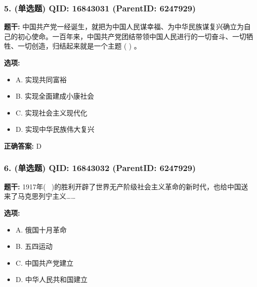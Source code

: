 \documentclass[12pt,UTF8]{ctexart}
\begin{document}
\vspace{0.3em}\hrulefill\vspace{0.7em}

\subsubsection*{5. (单选题) \small QID: 16843031 (ParentID: 6247929)}

\textbf{题干:}
中国共产党一经诞生，就把为中国人民谋幸福、为中华民族谋复兴确立为自己的初心使命。一百年来，中国共产党团结带领中国人民进行的一切奋斗、一切牺牲、一切创造，归结起来就是一个主题 ( ) 。



\textbf{选项:}
\begin{itemize}[leftmargin=*]

  \item A. 实现共同富裕

  \item B. 实现全面建成小康社会

  \item C. 实现社会主义现代化

  \item D. 实现中华民族伟大复兴

\end{itemize}

\textbf{正确答案:}
D

\vspace{0.3em}\hrulefill\vspace{0.7em}

\subsubsection*{6. (单选题) \small QID: 16843032 (ParentID: 6247929)}

\textbf{题干:}
1917年(  )的胜利开辟了世界无产阶级社会主义革命的新时代，也给中国送来了马克思列宁主义……



\textbf{选项:}
\begin{itemize}[leftmargin=*]

  \item A. 俄国十月革命

  \item B. 五四运动

  \item C. 中国共产党建立

  \item D. 中华人民共和国建立

\end{itemize}
\end{document}
